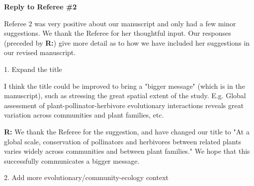 \documentclass[12pt]{letter}
\newenvironment{refquote}{\bigskip \begin{it}}{\end{it}\smallskip}
\begin{document}
\clearpage


{\Large \bf Reply to Referee \#2}

  Referee 2 was very positive about our manuscript and only had a few minor suggestions. We thank the Referee for her thoughtful input. Our responses (preceded by \textbf{R:}) give more detail as to how we have included her suggestions in our revised manuscript.


  1. Expand the title

    \begin{refquote}

      I think the title could be improved to bring a "bigger message" (which is in the manuscript), such as stressing the great spatial extent of the study. E.g. Global assessment of plant-pollinator-herbivore evolutionary interactions reveals great variation across communities and plant families, etc.

    \end{refquote}


    \textbf{R:} We thank the Referee for the suggestion, and have changed our title to "At a global scale, conservation of pollinators and herbivores between related plants varies widely across communities and between plant families." We hope that this successfully communicates a bigger message.


  2. Add more evolutionary/community-ecology context
\end{document}
